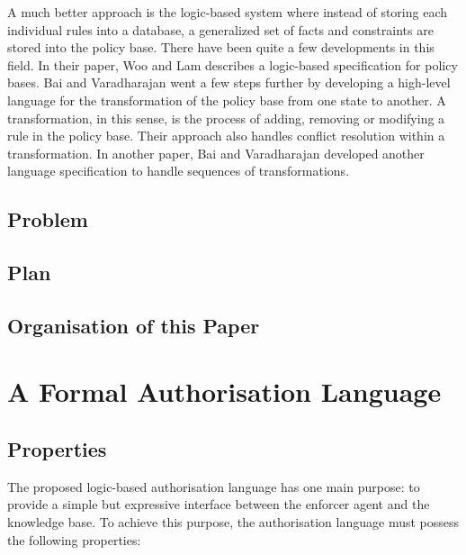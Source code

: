 \documentclass[a4paper]{article}
\begin{document}
      A much better approach is the logic-based system where instead of
      storing each individual rules into a database, a generalized set of
      facts and constraints are stored into the policy base. There have been
      quite a few developments in this field. In their paper, Woo and Lam
      \cite{WL} describes a logic-based specification for policy bases. Bai and
      Varadharajan \cite{BV1} went a few steps further by developing a
      high-level language for the transformation of the policy base from one
      state to another. A transformation, in this sense, is the process of
      adding, removing or modifying a rule in the policy base. Their approach
      also handles conflict resolution within a transformation. In another
      paper, Bai and Varadharajan \cite{BV2} developed another language
      specification to handle sequences of transformations.

    \subsection{Problem}

    \subsection{Plan}

    \subsection{Organisation of this Paper}

    \pagebreak

  \section{A Formal Authorisation Language}

    \subsection{Properties}

      The proposed logic-based authorisation language has one main purpose:
      to provide a simple but expressive interface between the enforcer
      agent and the knowledge base. To achieve this purpose, the authorisation
      language must possess the following properties:
\end{document}
